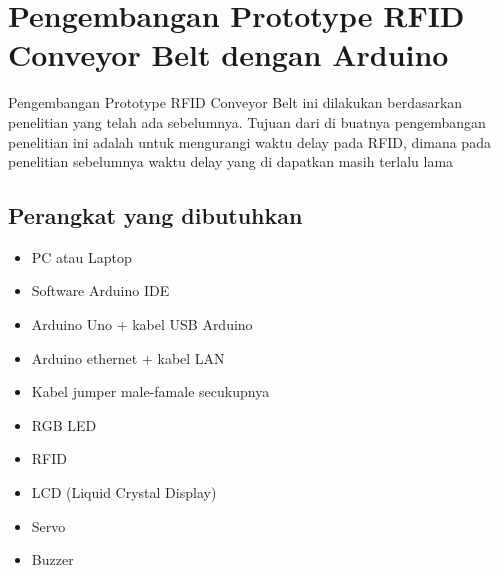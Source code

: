 \section{Pengembangan Prototype RFID Conveyor Belt dengan Arduino}
Pengembangan Prototype RFID Conveyor Belt ini dilakukan berdasarkan penelitian yang telah ada sebelumnya. Tujuan dari di buatnya pengembangan penelitian ini adalah untuk mengurangi waktu delay pada RFID, dimana pada penelitian sebelumnya waktu delay yang di dapatkan masih terlalu lama
\subsection{Perangkat yang dibutuhkan}
\begin{itemize}
\item PC atau Laptop
\item Software Arduino IDE
\item Arduino Uno + kabel USB Arduino
\item Arduino ethernet + kabel LAN
\item Kabel jumper male-famale secukupnya
\item RGB LED
\item RFID
\item LCD (Liquid Crystal Display)
\item Servo
\item Buzzer
\end{itemize}

